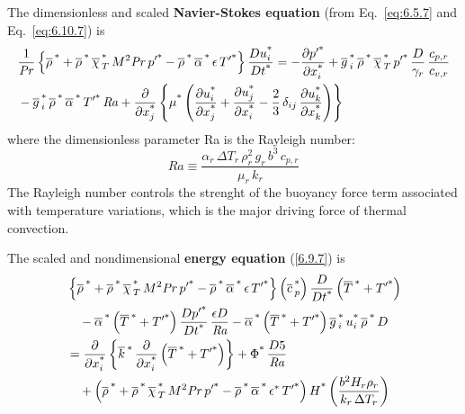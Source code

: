 \documentclass[document.tex]{subfiles}
\begin{document}
The dimensionless and scaled \textbf{Navier-Stokes equation} (from Eq.~\ref{eq:6.5.7} and Eq.~\ref{eq:6.10.7}) is 
\begin{align}
  & \frac{1}{\mathit{Pr}}
    \left\{ \overline{\rho}\,^{\textup{*}}
    + \overline{\rho}\,^{\textup{*}}\,\overline{\chi}\,_{T}^{\textup{*}}\, M^2 \mathit{Pr}\, p'^{\textup{*}}
    - \overline{\rho}\,^{\textup{*}}\,\overline{\alpha}\,^{\textup{*}}\,\epsilon\, T'^{\textup{*}}
    \right\}
    \frac{D u_i^{\textup{*}}}{D t^{\textup{*}}}
    = - \pdv{\ensuremath p'^{\textup{*}}}{\ensuremath x_i^{\textup{*}}}
    + \overline{g}\,_i^{\textup{*}}\,\overline{\rho}\,^{\textup{*}}\,\overline{\chi}\,_{T}^{\textup{*}}\, p'^{\textup{*}}\,
      \frac{D}{\gamma_r}\,\frac{c_{p,r}}{c_{v,r}} \nonumber \\
  & - \overline{g}\,_i^{\textup{*}}\,\overline{\rho}\,^{\textup{*}}\,\overline{\alpha}\,^{\textup{*}}\, T'^{\textup{*}}\, \mathit{Ra}
    + \pdv{\ensuremath x_j^{\textup{*}}}
    \left\{ \mu^{\textup{*}}
    \left( \pdv{\ensuremath u_i^{\textup{*}}}{\ensuremath x_j^{\textup{*}}} + \pdv{\ensuremath u_j^{\textup{*}}}{\ensuremath x_i^{\textup{*}}}
    - \frac{2}{3}\,\delta_{ij}\,\pdv{\ensuremath u_k^{\textup{*}}}{\ensuremath x_k^{\textup{*}}} \right)
    \right\}
  \label{eq:6.10.19}
\end{align}
where the dimensionless parameter Ra is the Rayleigh number:
\begin{equation}
  \mathit{Ra} \equiv
  \frac{\alpha_r \, \Delta T_r \, \rho_r^2 \, g_r \, b^3 \, c_{p,r}}
       {\mu_r \, k_r}
  \label{eq:6.10.20}
\end{equation}
The Rayleigh number controls the strenght of the buoyancy force term associated with temperature variations, 
which is the major driving force of thermal convection. 

The scaled and nondimensional \textbf{energy equation} (\ref{6.9.7}) is 
\begin{align}
  & \left\{ \overline{\rho}\,^{\textup{*}}
    + \overline{\rho}\,^{\textup{*}}\,\overline{\chi}\,_{T}^{\textup{*}}\, M^2 \mathit{Pr}\, p'^{\textup{*}}
    - \overline{\rho}\,^{\textup{*}}\,\overline{\alpha}\,^{\textup{*}}\,\epsilon\, T'^{\textup{*}} \right\}
    \left( \overline{c}\,_p^{\textup{*}} \right)
    \frac{D }{D t^{\textup{*}}}
    \left( \overline{T}\,^{\textup{*}} + T'^{\textup{*}} \right)
    \nonumber \\
  & \quad - \overline{\alpha}\,^{\textup{*}}
    \left( \overline{T}\,^{\textup{*}} + T'^{\textup{*}} \right)
    \frac{D p'^{\textup{*}}}{D t^{\textup{*}}}\,\frac{\epsilon D}{\mathit{Ra}}
    - \overline{\alpha}\,^{\textup{*}}
    \left( \overline{T}\,^{\textup{*}} + T'^{\textup{*}} \right)
    \overline{g}\,_i^{\textup{*}}\,u_i^{\textup{*}}\,\overline{\rho}\,^{\textup{*}}\,D
    \nonumber \\
  & = \pdv{\ensuremath x_i^{\textup{*}}}
    \left\{ \overline{k}\,^{\textup{*}}\,\pdv{\ensuremath x_i^{\textup{*}}}
    \left( \overline{T}\,^{\textup{*}} + T'^{\textup{*}} \right) \right\}
    + \Phi^{\textup{*}}\,\frac{D5}{\mathit{Ra}}
    \nonumber \\
  & \quad + \left( \overline{\rho}\,^{\textup{*}}
    + \overline{\rho}\,^{\textup{*}}\,\overline{\chi}\,_{T}^{\textup{*}}\, M^2 \mathit{Pr}\, p'^{\textup{*}}
    - \overline{\rho}\,^{\textup{*}}\,\overline{\alpha}\,^{\textup{*}}\,\epsilon^{*}\, T'^{\textup{*}} \right)
    H^{\textup{*}}
    \left( \frac{b^2 H_r \rho_r}{k_r \, \Delta T_r} \right)
  \label{eq:6.10.25}
\end{align}
\end{document}
